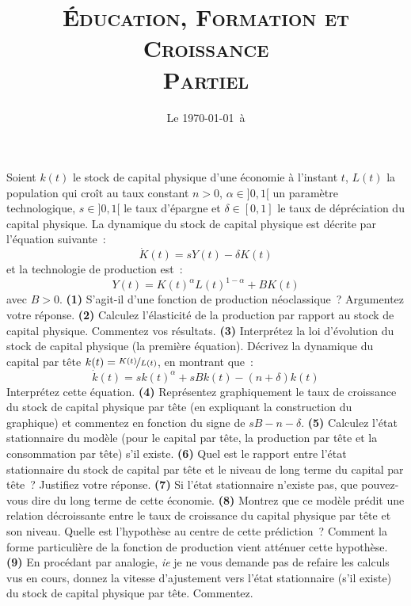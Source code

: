 \documentclass[10pt,a4paper,notitlepage]{article}
\newcommand{\question}[1]{\textbf{(#1)}}
\begin{document}
\title{\textsc{Éducation, Formation et Croissance\\ \small{Partiel}}}
\date{Le \today\ à \thistime}

\maketitle

Soient $k(t)$ le stock de capital physique d'une économie à l'instant
$t$, $L(t)$ la population qui croît au taux constant $n>0$,
$\alpha\in]0,1[$ un paramètre technologique, $s\in]0,1[$ le taux
d'épargne et $\delta\in[0,1]$ le taux de dépréciation du capital
physique. La dynamique du stock de capital physique est décrite par
l'équation suivante :
\[
\dot K(t) = sY(t)-\delta K(t)
\]
et la technologie de production est :
\[
Y(t) = K(t)^\alpha L(t)^{1-\alpha} + BK(t)
\]
avec $B>0$. \question{1} S'agit-il d'une fonction de production
néoclassique ? Argumentez votre réponse. \question{2} Calculez
l'élasticité de la production par rapport au stock de capital
physique. Commentez vos résultats. \question{3}
Interprétez la loi d'évolution du stock de capital physique (la
première équation). Décrivez la dynamique du capital
par tête $k(t)=\nicefrac{K(t)}{L(t)}$, en montrant que :
\[
\dot k(t) = sk(t)^{\alpha}+sBk(t)-(n+\delta)k(t)
\]
Interprétez cette équation. \question{4} Représentez graphiquement le taux de
croissance du stock de capital physique par tête (en expliquant la
construction du graphique) et commentez en fonction du signe de
$sB-n-\delta$. \question{5} Calculez l'état stationnaire du modèle
(pour le capital par tête, la production par tête et la consommation
par tête) s'il existe. \question{6} Quel est le rapport entre l'état
stationnaire du stock de capital par tête et le niveau de long terme
du capital par tête ? Justifiez votre réponse. \question{7} Si l'état
stationnaire n'existe pas, que pouvez-vous dire du long terme de cette
économie. \question{8} Montrez que ce modèle prédit une relation
décroissante entre le taux de croissance du capital physique par tête et
son niveau. Quelle est l'hypothèse au centre de cette prédiction ? Comment la forme
particulière de la fonction de production vient atténuer cette
hypothèse. \question{9} En procédant par analogie, \emph{ie} je ne
vous demande pas de refaire les calculs vus en cours, donnez la
vitesse d'ajustement vers l'état stationnaire (s'il existe) du stock
de capital physique par tête. Commentez.
\end{document}
